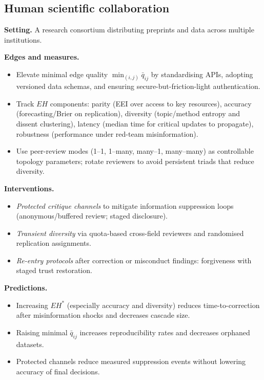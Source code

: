 \documentclass[12pt]{article}
\begin{document}
\subsection{Human scientific collaboration}
\textbf{Setting.} A research consortium distributing preprints and data across multiple institutions.
\medskip

\noindent\textbf{Edges and measures.} 
\begin{itemize}[leftmargin=1.2em]
\item Elevate minimal edge quality $\min_{(i,j)} \bar{q}_{ij}$ by standardising APIs, adopting versioned data schemas, and ensuring secure-but-friction-light authentication.
\item Track $EH$ components: parity (EEI over access to key resources), accuracy (forecasting/Brier on replication), diversity (topic/method entropy and dissent clustering), latency (median time for critical updates to propagate), robustness (performance under red-team misinformation).
\item Use peer-review modes (1--1, 1--many, many--1, many--many) as controllable topology parameters; rotate reviewers to avoid persistent triads that reduce diversity.
\end{itemize}

\noindent\textbf{Interventions.}
\begin{itemize}[leftmargin=1.2em]
\item \emph{Protected critique channels} to mitigate information suppression loops (anonymous/buffered review; staged disclosure).
\item \emph{Transient diversity} via quota-based cross-field reviewers and randomised replication assignments.
\item \emph{Re-entry protocols} after correction or misconduct findings: forgiveness with staged trust restoration.
\end{itemize}

\noindent\textbf{Predictions.}
\begin{itemize}[leftmargin=1.2em]
\item Increasing $EH^\ast$ (especially accuracy and diversity) reduces time-to-correction after misinformation shocks and decreases cascade size.
\item Raising minimal $\bar{q}_{ij}$ increases reproducibility rates and decreases orphaned datasets.
\item Protected channels reduce measured suppression events without lowering accuracy of final decisions.
\end{itemize}
\end{document}
